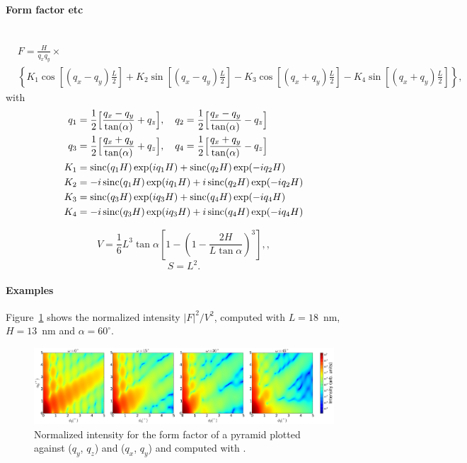 \paragraph{Form factor etc}\strut\\
\begin{align*}
&F = 
\frac{H}{q_x q_y} \times \nonumber \\ &\left\{ K_1 \cos\left[
  (q_x-q_y)\frac{L}{2} \right] + K_2 \sin\left[ (q_x-q_y)\frac{L}{2} \right]
- K_3 \cos\left[ (q_x+q_y) \frac{L}{2} \right] - K_4 \sin\left[ (q_x+q_y)\frac{L}{2} \right]\right\},
\end{align*}
with
\begin{align*}
       q_1 &=\frac{1}{2}\Big[\frac{q_x-q_y}{\tan(\alpha)} + q_z\Big],\quad       q_2 =\frac{1}{2}\Big[\frac{q_x-q_y}{\tan(\alpha)} - q_z\Big]\\
        q_3 &=\frac{1}{2}\Big[\frac{q_x+q_y}{\tan(\alpha)} + q_z\Big],\quad       q_4 =\frac{1}{2}\Big[\frac{q_x+q_y}{\tan(\alpha)} - q_z\Big]\\
        K_1 &= \operatorname{sinc}(q_1 H)\exp(i q_1 H)  + \operatorname{sinc}(q_2 H) \exp(-i q_2 H)\\
        K_2 &= -i \operatorname{sinc}(q_1 H) \exp(i q_1 H) +i \operatorname{sinc}(q_2 H) \exp(-i q_2 H)\\
        K_3 &= \operatorname{sinc}(q_3 H) \exp(i q_3 H)    + \operatorname{sinc}(q_4 H) \exp(-i q_4 H)\\
        K_4 &= -i \operatorname{sinc}(q_3 H) \exp(i q_3 H) + i \operatorname{sinc}(q_4 H) \exp(-i q_4 H) 
   \end{align*}

\begin{equation*}
  V = \dfrac{1}{6}  L^3 \tan\alpha\left[ 1
             - \left(1 - \dfrac{2H}{L\tan\alpha}\right)^3 \right],,
\end{equation*}
\begin{equation*}
  S = L^2.
\end{equation*}

\paragraph{Examples}
Figure~\ref{fig:FFPyramidEx} shows the normalized intensity
$|F|^2/V^2$, computed with $L=18$~nm, $H=13$~nm and
$\alpha=60^{\circ}$.

\begin{figure}[h]
\begin{center}
\includegraphics[width=\textwidth]{fig/ff2/ff_pyramid.pdf}
\end{center}
\caption{Normalized intensity for the form factor of a
  pyramid plotted against ($q_y$, $q_z$) and  
  ($q_x$, $q_y$) and computed with  .}
\label{fig:FFPyramidEx}
\end{figure}

